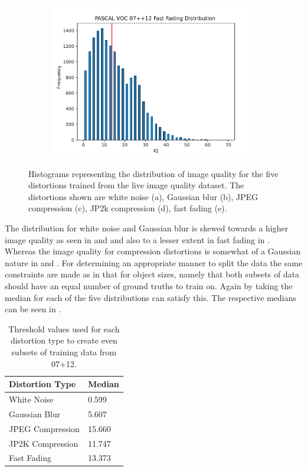 \begin{figure}[H]
\begin{subfigure}[b]{0.4\textwidth}
        \includegraphics[width=\textwidth]{Figs/Implementation/FastFadingdistred.pdf}
        \caption{}\label{fig:dist_ff}
    \end{subfigure}
    \caption{Histograms representing the distribution of image quality for the five distortions trained from the \gls{live} image quality dataset. The distortions shown are white noise (a), Gaussian blur (b), JPEG compression (c), JP2k compression (d), fast fading (e).}
    \label{fig:iqdist}
\end{figure} 

The distribution for white noise and Gaussian blur is skewed towards a higher image quality as seen in  and  and also to a lesser extent in fast fading in . Whereas the image quality for compression distortions is somewhat of a Gaussian nature in  and . For determining an appropriate manner to split the data the same constraints are made as in that for object sizes, namely that both subsets of data should have an equal number of ground truths to train on. Again by taking the median for each of the five distributions can satisfy this. The respective medians can be seen in .

\begin{table}[h]
\centering
\caption{Threshold values used for each distortion type to create even subsets of training data from 07+12.}
\label{tab:iq_splits}
\begin{tabular}{|l|l|}
\hline
\textbf{Distortion Type}   & \textbf{Median} \\ \hline
White Noise       & 0.599  \\ \hline
Gaussian Blur     & 5.607  \\ \hline
JPEG Compression  & 15.660 \\ \hline
JP2K Compression & 11.747 \\ \hline
Fast Fading       & 13.373 \\ \hline
\end{tabular}
\end{table}

